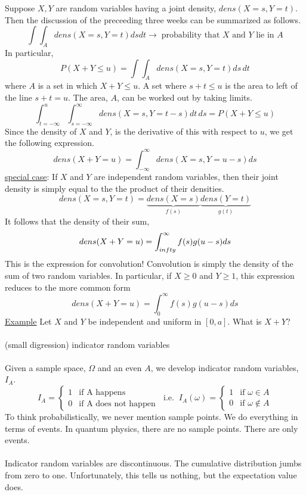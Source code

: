 Suppose $X,Y$ are random variables having a joint density, $dens(X=s,Y=t)$.  Then the discussion of the preceeding three weeks can be summarized as follows.
$$\int\int_A\!\! dens(X=s,Y=t)dsdt\to\;\mbox{probability that $X$ and $Y$ lie in $A$}$$
In particular, 
$$P(X+Y\leq u)=\int\int_A\!dens(X\!=\!s,Y\!=\!t)ds\,dt$$ 
where $A$ is a set in which $X+Y\leq u$.  A set where $s+t\leq u$ is the area to left of the line $s+t=u$.  The area, $A$, can be worked out by taking limits.
$$\int_{t=-\infty}^u\!\int_{s=-\infty}^{\infty}\!\!\!dens(X=s,Y=t-s)dt\,ds=P(X+Y\leq u)$$
Since the density of $X$ and $Y$, is the derivative of this with respect to $u$, we get the following expression.
$$dens(X+Y=u)=\int_{-\infty}^{\infty}\!\!\!dens(X=s,Y=u-s)ds$$
\noindent\underline{special case}:  If $X$ and $Y$ are independent random variables, then their joint density is simply equal to the the product of their densities.
$$dens(X=s,Y=t)=\underbrace{dens(X=s)}_{f(s)}\underbrace{dens(Y=t)}_{g(t)}$$ 
It follows that the density of their sum,
$$dens(X+Y=u)=\int_{\-infty}^{\infty}f(s)g(u-s)ds$$
This is the expression for convolution!  Convolution is simply the density of the sum of two random variables.  In particular, if $X\geq 0$ and $Y\geq 1$, this expression reduces to the more common form
$$dens(X+Y=u)=\int_0^{\infty}\!\!f(s)g(u-s)ds$$
\noindent\underline{Example}  Let $X$ and $Y$ be independent and uniform in $[0,a]$.  What is $X+Y$?\\\\
\noindent(small digression) indicator random variables\\\\
Given a sample space, $\Omega$ and an even $A$, we develop indicator random variables, $I_A$.
$$I_A=\left\{ \begin{array}{ll}1&\mbox{if A happens}\\0&\mbox{if A does not happen}\end{array}\right.\;\;\mbox{i.e.}\;\;I_A(\omega)=\left\{\begin{array}{ll}1&\mbox{if $\omega\in A$}\\0&\mbox{if $\omega\notin A$}\end{array}\right.$$
To think probabilistically, we never mention sample points.  We do everything in terms of events.  In quantum physics, there are no sample points.  There are only events.\\\\
Indicator random variables are discontinuous.  The cumulative distribution jumbs from zero to one.  Unfortunately, this tells us nothing, but the expectation value does.  
